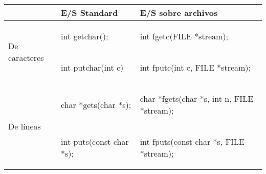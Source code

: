\begin{table}[hbtp]
\centering
\begin{tabular}{l|l|l}
	\hline
			& E/S Standard			& E/S sobre archivos \\
    \hline
    \multirow{2}{*}{De caracteres}  & 
\begin{codecell}
int getchar();	
\end{codecell}
& 
\begin{codecell}
int fgetc(FILE *stream); 
\end{codecell}
\\
    								&
\begin{codecell}
int putchar(int c) 
\end{codecell}
& 
\begin{codecell}
int fputc(int c, FILE *stream); 
\end{codecell}
\\
    \hline
    \multirow{2}{*}{De líneas}  & 
\begin{codecell}
char *gets(char *s);
\end{codecell}
	& 
\begin{codecell}
char *fgets(char *s, 
int n, FILE *stream);
\end{codecell}
\\
    								&
\begin{codecell}
int puts(const char *s);
\end{codecell}
  & 
\begin{codecell}
int fputs(const char *s, 
FILE *stream);
\end{codecell}
 \\
    

\end{tabular}
\end{table}
